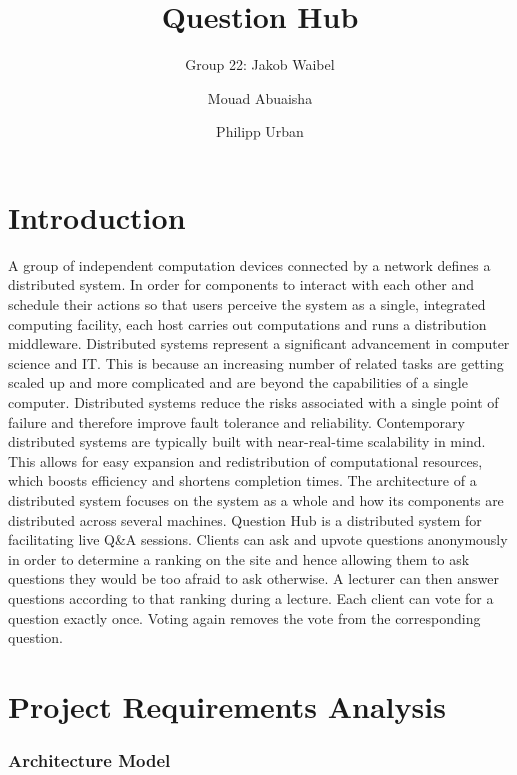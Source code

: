\documentclass[runningheads]{llncs}
\begin{document}
\title{Question Hub}

\author{Group 22: Jakob Waibel \and Mouad Abuaisha \and Philipp Urban}

\institute{}
\maketitle              

\section{Introduction}

A group of independent computation devices connected by a network defines a
distributed system. In order for components to interact with each other and
schedule their actions so that users perceive the system as a single,
integrated computing facility, each host carries out computations and runs a
distribution middleware\cite{coulouris2005distributed}. Distributed systems
represent a significant advancement in computer science and IT. This is because
an increasing number of related tasks are getting scaled up and more
complicated and are beyond the capabilities of a single computer. Distributed
systems reduce the risks associated with a single point of failure and
therefore improve fault tolerance and reliability. Contemporary distributed
systems are typically built with near-real-time scalability in mind. This
allows for easy expansion and redistribution of computational resources, which
boosts efficiency and shortens completion times. The architecture of a 
distributed system focuses on the system as a whole and how its components are
distributed across several machines\cite{tanenbaum2007distributed}.
\newline
\newline
Question Hub is a distributed system for facilitating live Q\&A sessions.
Clients can ask and upvote questions anonymously in order to determine a
ranking on the site and hence allowing them to ask questions they would be too
afraid to ask otherwise. A lecturer can then answer questions according to that
ranking during a lecture. Each client can vote for a question exactly once.
Voting again removes the vote from the corresponding question.

\section{Project Requirements Analysis}

\subsubsection{Architecture Model}
\end{document}
